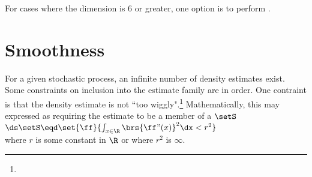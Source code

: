 For cases where the dimension is 6 or greater, one option is to perform 
 .


\section{Smoothness}
For a given stochastic process, an infinite number of density estimates exist. 
Some constraints on inclusion into the estimate family are in order. 
One contraint is that the density estimate is not ``too wiggly".\footnote{
  }
Mathematically, this may expressed as requiring the estimate to be a member of a  $\setS$
\\\indentx$\ds \setS \eqd \set{\ff}{\int_{x\in\R} \brs{\ff"(x)}^2 \dx < r^2}$\\
where $r$ is some constant in $\R$ or where $r^2$ is $\infty$.



